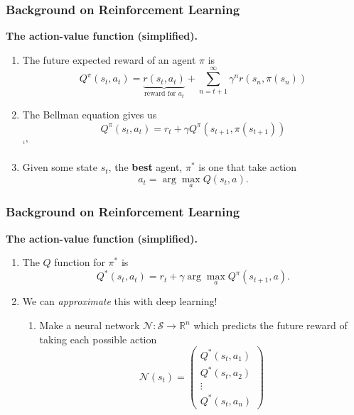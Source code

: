 \documentclass{beamer}
\numberwithin{equation}{subsection}
\numberwithin{theorem}{subsection}
\def\scriptn{{\mathcal N}}
\def\scripts{{\mathcal S}}
\begin{document}
\begin{frame}
\frametitle{Background on Reinforcement Learning}
  \textbf{The action-value function (simplified).}
  \begin{enumerate}
    \item  The future expected reward of an agent $\pi$ is
    \begin{equation*}
      Q^\pi(s_t, a_t) = \underbrace{r(s_t, a_t)}_{\text{reward for } a_t} + \sum_{n={t+1}}^\infty \gamma^n r(s_n, \pi(s_n))
    \end{equation*}
    \item The Bellman equation gives us
    \begin{equation*}
      Q^\pi(s_t, a_t) = r_t + \gamma Q^\pi(s_{t+1}, \pi(s_{t+1}))
    \end{equation*}`'
    \item Given some state $s_t$, the \textbf{best} agent, $\pi^*$ is one that take action
    \begin{equation*}
      a_t = \arg \max_a Q(s_t, a).
    \end{equation*}
  \end{enumerate}
\end{frame}

\begin{frame}
\frametitle{Background on Reinforcement Learning}
  \textbf{The action-value function (simplified).}
  \begin{enumerate}
    \item The $Q$ function for $\pi^*$ is
    \begin{equation*}
      Q^*(s_t, a_t) = r_t + \gamma \arg \max_a Q^\pi(s_{t+1}, a).
    \end{equation*}
    \item We can \emph{approximate} this with deep learning!
    \begin{enumerate}
      \item Make a neural network $\scriptn: \scripts \to \mathbb{R}^n$ which predicts
      the future reward of taking each possible action
      \begin{equation*}
        \scriptn(s_t) =\begin{pmatrix}
            Q^*(s_t, a_1) \\
             Q^*(s_t, a_2)\\
             \vdots \\
              Q^*(s_t, a_n)
        \end{pmatrix}
      \end{equation*}
    \end{enumerate}
  \end{enumerate}
\end{frame}
\end{document}
